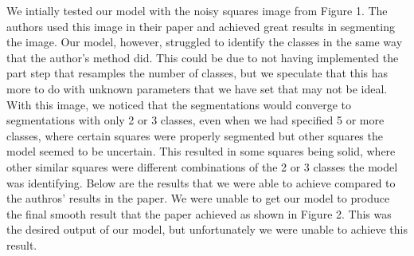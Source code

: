 \documentclass[11pt]{article}
\begin{document}
We intially tested our model with the noisy squares image from Figure 1.
The authors used this image in their paper and achieved great results in segmenting the image.
Our model, however, struggled to identify the classes in the same way that the author's method did.
This could be due to not having implemented the part step that resamples the number of classes, but we speculate that this has more to do with unknown parameters that we have set that may not be ideal.
With this image, we noticed that the segmentations would converge to segmentations with only 2 or 3 classes, even when we had specified 5 or more classes, where certain squares were properly segmented but other squares the model seemed to be uncertain.
This resulted in some squares being solid, where other similar squares were different combinations of the 2 or 3 classes the model was identifying.
Below are the results that we were able to achieve compared to the authros' results in the paper.
We were unable to get our model to produce the final smooth result that the paper achieved as shown in Figure 2.
This was the desired output of our model, but unfortunately we were unable to achieve this result.
\end{document}
